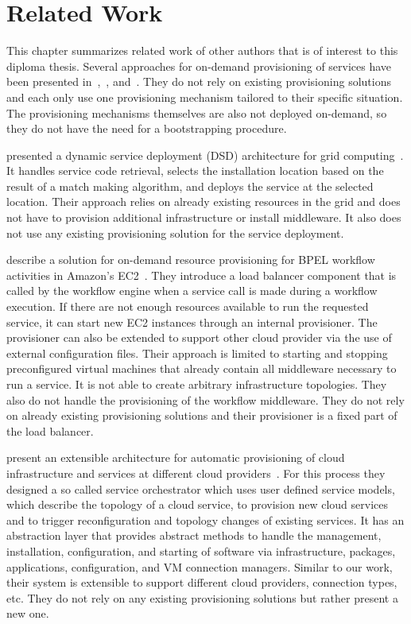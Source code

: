 \chapter{Related Work}
\label{related}

This chapter summarizes related work of other authors that is of interest to this diploma thesis.
Several approaches for on-demand provisioning of services have been presented in~\autocite{applyingwebservice},~\autocite{ondemandbpel}, and~\autocite{provisioning:architecture}.
They do not rely on existing provisioning solutions and each only use one provisioning mechanism tailored to their specific situation.
The provisioning mechanisms themselves are also not deployed on-demand, so they do not have the need for a bootstrapping procedure.

\citeauthor*{applyingwebservice} presented a dynamic service deployment (DSD) architecture for grid computing~\autocite{applyingwebservice}.
It handles service code retrieval, selects the installation location based on the result of a match making algorithm, and deploys the service at the selected location.
Their approach relies on already existing resources in the grid and does not have to provision additional infrastructure or install middleware.
It also does not use any existing provisioning solution for the service deployment.

\citeauthor*{ondemandbpel} describe a solution for on-demand resource provisioning for BPEL workflow activities in Amazon's EC2~\autocite{ondemandbpel}.
They introduce a load balancer component that is called by the workflow engine when a service call is made during a workflow execution.
If there are not enough resources available to run the requested service, it can start new EC2 instances through an internal provisioner.
The provisioner can also be extended to support other cloud provider via the use of external configuration files.
Their approach is limited to starting and stopping preconfigured virtual machines that already contain all middleware necessary to run a service.
It is not able to create arbitrary infrastructure topologies.
They also do not handle the provisioning of the workflow middleware.
They do not rely on already existing provisioning solutions and their provisioner is a fixed part of the load balancer.

\citeauthor*{provisioning:architecture} present an extensible architecture for automatic provisioning of cloud infrastructure and services at different cloud providers~\autocite{provisioning:architecture}.
For this process they designed a so called service orchestrator which uses user defined service models, which describe the topology of a cloud service, to provision new cloud services and to trigger reconfiguration and topology changes of existing services.
It has an abstraction layer that provides abstract methods to handle the management, installation, configuration, and starting of software via infrastructure, packages, applications, configuration, and VM connection managers.
Similar to our work, their system is extensible to support different cloud providers, connection types, etc.
They do not rely on any existing provisioning solutions but rather present a new one.

